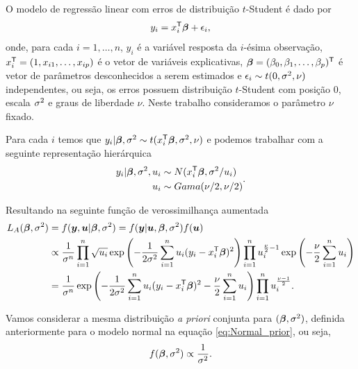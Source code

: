 O modelo de regressão linear com erros de distribuição  $t$-Student é dado por
\begin{equation}
y_i = x_i^{\mathsf{T}}{\boldsymbol{\beta}} + \epsilon_i,
\end{equation}
onde, para cada $i=1,\ldots,n$, $y_i$ é a variável resposta da $i$-ésima observação, $x_i^{\mathsf{T}}=(1,x_{i1},\ldots,x_{ip})$ é o vetor de variáveis explicativas, ${\boldsymbol{\beta}}=(\beta_0,\beta_1,\ldots,\beta_p)^{\mathsf{T}}$ é vetor de parâmetros desconhecidos a serem estimados e $\epsilon_i\sim t(0,\sigma^2,\nu)$ independentes, ou seja, os erros possuem distribuição $t$-Student com posição $0$, escala $\sigma^2$ e graus de liberdade $\nu$. Neste trabalho consideramos o parâmetro $\nu$ fixado.

Para cada $i$ temos que $y_i|{\boldsymbol{\beta}},\sigma^2 \sim t(x_i^{\mathsf{T}}{\boldsymbol{\beta}},\sigma^2,\nu)$ e podemos trabalhar com a seguinte representação hierárquica
\begin{equation}
\begin{split}
y_i|{\boldsymbol{\beta}},\sigma^2, u_i & \sim N(x_i^{\mathsf{T}}{\boldsymbol{\beta}},\sigma^2/u_i) \\
u_i &\sim Gama(\nu/2,\nu/2)
\end{split}
.
\end{equation}

Resultando na seguinte função de verossimilhança aumentada
\begin{equation}
\begin{split}
L_A({\boldsymbol{\beta}},\sigma^2) & = f({\boldsymbol{y}},{\boldsymbol{u}}|{\boldsymbol{\beta}},\sigma^2) = f({\boldsymbol{y}}|{\boldsymbol{u}},{\boldsymbol{\beta}},\sigma^2)f({\boldsymbol{u}}) \\
{} & \propto \frac{1}{\sigma^n}\prod_{i=1}^n\sqrt{u_i} \exp\left(-\frac{1}{2\sigma^2}\sum_{i=1}^nu_i(y_i-x_i ^{\mathsf{T}}{\boldsymbol{\beta}})^2\right) \prod_{i=1}^n u_i^{\frac{\nu}{2}-1}\exp\left(-\frac{\nu}{2}\sum_{i=1}^n u_i\right) \\
{} & = \frac{1}{\sigma^n}\exp\left(-\frac{1}{2\sigma^2}\sum_{i=1}^nu_i(y_i-x_i ^{\mathsf{T}}{\boldsymbol{\beta}})^2-\frac{\nu}{2}\sum_{i=1}^n u_i\right)\prod_{i=1}^n u_i^\frac{\nu-1}{2}.
\end{split}
\end{equation}

Vamos considerar a mesma distribuição \textit{a priori} conjunta para $({\boldsymbol{\beta}},\sigma^2)$, definida anteriormente para o modelo normal na equação \eqref{eq:Normal_prior}, ou seja,
\begin{equation}
f({\boldsymbol{\beta}},\sigma^2)\propto \frac{1}{\sigma^2}.
\end{equation}

